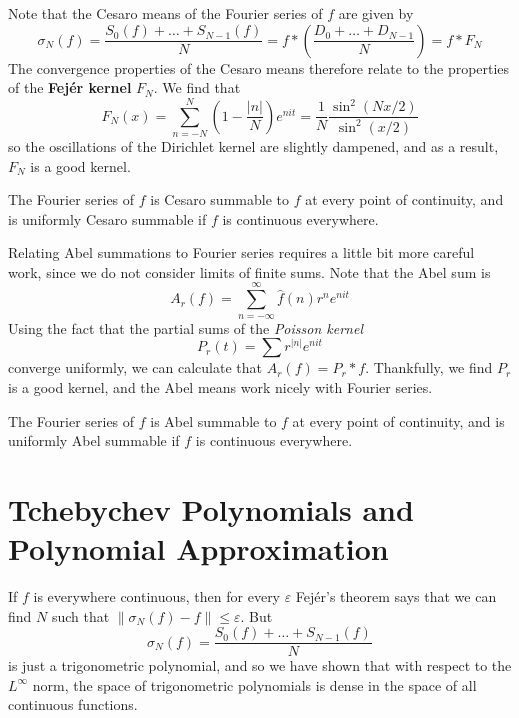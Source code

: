 Note that the Cesaro means of the Fourier series of $f$ are given by
%
\[ \sigma_N(f) = \frac{S_0(f) + \dots + S_{N-1}(f)}{N} = f * \left( \frac{D_0 + \dots + D_{N-1}}{N} \right) = f * F_N \]
%
The convergence properties of the Cesaro means therefore relate to the properties of the {\bf Fej\'{e}r kernel} $F_N$. We find that
%
\[ F_N(x) = \sum_{n = -N}^N \left( 1 - \frac{|n|}{N} \right) e^{nit} = \frac{1}{N} \frac{\sin^2(Nx/2)}{\sin^2(x/2)} \]
%
so the oscillations of the Dirichlet kernel are slightly dampened, and as a result, $F_N$ is a good kernel.

\begin{theorem}
    The Fourier series of $f$ is Cesaro summable to $f$ at every point of continuity, and is uniformly Cesaro summable if $f$ is continuous everywhere.
\end{theorem}

Relating Abel summations to Fourier series requires a little bit more careful work, since we do not consider limits of finite sums. Note that the Abel sum is
%
\[ A_r(f) = \sum_{n = -\infty}^\infty \widehat{f}(n) r^n e^{nit} \]
%
Using the fact that the partial sums of the {\it Poisson kernel}
%
\[ P_r(t) = \sum r^{|n|} e^{nit} \]
%
converge uniformly, we can calculate that $A_r(f) = P_r * f$. Thankfully, we find $P_r$ is a good kernel, and the Abel means work nicely with Fourier series.

\begin{theorem}
	The Fourier series of $f$ is Abel summable to $f$ at every point of continuity, and is uniformly Abel summable if $f$ is continuous everywhere.
\end{theorem}

\section{Tchebychev Polynomials and Polynomial Approximation}

If $f$ is everywhere continuous, then for every $\varepsilon$ Fej\'{e}r's theorem says that we can find $N$ such that $\| \sigma_N(f) - f \| \leq \varepsilon$. But
%
\[ \sigma_N(f) = \frac{S_0(f) + \dots + S_{N-1}(f)}{N} \]
%
is just a trigonometric polynomial, and so we have shown that with respect to the $L^\infty$ norm, the space of trigonometric polynomials is dense in the space of all continuous functions. 

